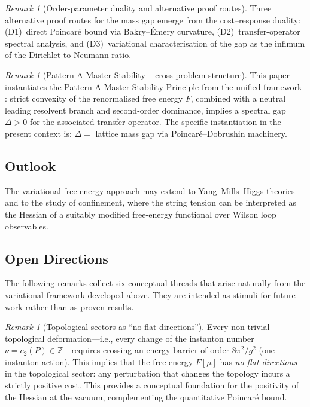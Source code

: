 \documentclass[12pt,a4paper]{article}
\theoremstyle{definition}
\theoremstyle{plain}
\theoremstyle{remark}
\newtheorem{remark}[definition]{Remark}
\begin{document}
\begin{remark}[Order-parameter duality and alternative proof routes]
\label{rem:order-parameter-duality}
Three alternative proof routes for the mass gap emerge from the cost--response duality: (D1)~direct Poincar\'e bound via Bakry--\'Emery curvature, (D2)~transfer-operator spectral analysis, and (D3)~variational characterisation of the gap as the infimum of the Dirichlet-to-Neumann ratio.
\end{remark}

\begin{remark}[Pattern A Master Stability -- cross-problem structure]
This paper instantiates the Pattern A Master Stability Principle from the unified framework \cite{FST-Unified2026}: strict convexity of the renormalised free energy $F$, combined with a neutral leading resolvent branch and second-order dominance, implies a spectral gap $\Delta > 0$ for the associated transfer operator. The specific instantiation in the present context is: $\Delta = $ lattice mass gap via Poincar\'e--Dobrushin machinery.
\end{remark}

\subsection{Outlook}

The variational free-energy approach may extend to Yang--Mills--Higgs theories and to the study of confinement, where the string tension can be interpreted as the Hessian of a suitably modified free-energy functional over Wilson loop observables.


\subsection{Open Directions}

The following remarks collect six conceptual threads that arise naturally from the variational framework developed above. They are intended as stimuli for future work rather than as proven results.

\begin{remark}[Topological sectors as ``no flat directions'']
\label{rem:topological-no-flat}
Every non-trivial topological deformation---i.e., every change of the instanton number $\nu = c_2(P) \in \mathbb{Z}$---requires crossing an energy barrier of order $8\pi^2/g^2$ (one-instanton action). This implies that the free energy $F[\mu]$ has \emph{no flat directions} in the topological sector: any perturbation that changes the topology incurs a strictly positive cost. This provides a conceptual foundation for the positivity of the Hessian at the vacuum, complementing the quantitative Poincar\'e bound.
\end{remark}
\end{document}
